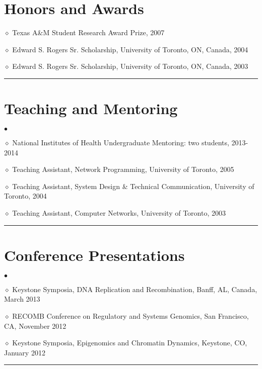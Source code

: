 \documentclass[12pt, centered, centered]{res_yy}
\newenvironment{list1}{
  \begin{list}{\ding{113}}{%
      \setlength{\itemsep}{0in}
      \setlength{\parsep}{0in} \setlength{\parskip}{0in}
      \setlength{\topsep}{0in} \setlength{\partopsep}{0in} 
      \setlength{\leftmargin}{0.17in}}}{\end{list}}
\newenvironment{list2}{
  \begin{list}{$\bullet$}{%
      \setlength{\itemsep}{0in}
      \setlength{\parsep}{0in} \setlength{\parskip}{0in}
      \setlength{\topsep}{0in} \setlength{\partopsep}{0in} 
      \setlength{\leftmargin}{0.2in}}}{\end{list}}
\begin{document}
\begin{resume}
\section{\sc Honors and Awards} 
\vspace{.2in}
\begin{list1}
\item[$\diamond$] Texas A\&M Student Research Award Prize, 2007
\item[$\diamond$] Edward S. Rogers Sr. Scholarship, University of Toronto, ON, Canada, 2004
\item[$\diamond$] Edward S. Rogers Sr. Scholarship, University of Toronto, ON, Canada, 2003
\end{list1}
\vspace{-.1in}
\rule{\linewidth}{0.05mm}

\section{\sc Teaching and Mentoring} 
\vspace{.2in}
\begin{list2}
\item[$\diamond$] National Institutes of Health Undergraduate Mentoring: two students, 2013-2014
\item[$\diamond$] Teaching Assistant, Network Programming, University of Toronto, 2005
\item[$\diamond$] Teaching Assistant, System Design \& Technical Communication, University of Toronto, 2004
\item[$\diamond$] Teaching Assistant, Computer Networks, University of Toronto, 2003
\end{list2}
\vspace{-.1in}
\rule{\linewidth}{0.05mm}



\section{\sc Conference Presentations}
\vspace{.2in}
\begin{list2}
\item[$\diamond$] Keystone Symposia, DNA Replication and Recombination, Banff, AL, Canada, March 2013
\item[$\diamond$] RECOMB Conference on Regulatory and Systems Genomics, San Francisco, CA, November 2012
\item[$\diamond$] Keystone Symposia, Epigenomics and Chromatin Dynamics, Keystone, CO, January 2012
\end{list2}
\vspace{-.1in}
\rule{\linewidth}{0.05mm}


\end{resume}
\end{document}
